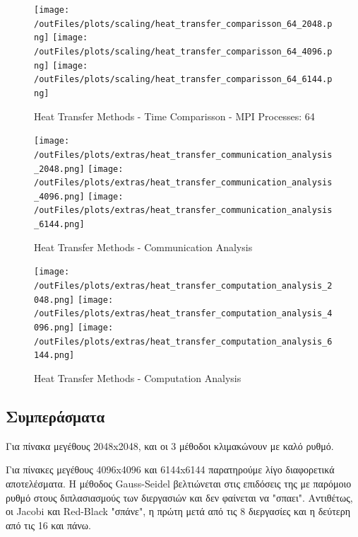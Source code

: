 \documentclass[../final_report.tex]{subfiles}
\begin{document}
\begin{figure}[H]
    \centering
    \texttt{[image: /outFiles/plots/scaling/heat\_transfer\_comparisson\_64\_2048.png]}
    \texttt{[image: /outFiles/plots/scaling/heat\_transfer\_comparisson\_64\_4096.png]}
    \texttt{[image: /outFiles/plots/scaling/heat\_transfer\_comparisson\_64\_6144.png]}
    \caption{Heat Transfer Methods - Time Comparisson - MPI Processes: 64}
    \label{fig:Heat Transfer Methods - Time Comparisson - MPI Processes: 64}
\end{figure}

\begin{figure}[H]
    \centering
    \texttt{[image: /outFiles/plots/extras/heat\_transfer\_communication\_analysis\_2048.png]}
    \texttt{[image: /outFiles/plots/extras/heat\_transfer\_communication\_analysis\_4096.png]}
    \texttt{[image: /outFiles/plots/extras/heat\_transfer\_communication\_analysis\_6144.png]}
    \caption{Heat Transfer Methods - Communication Analysis}
    \label{fig:Heat Transfer Methods - Communication Analysis}
\end{figure}

\begin{figure}[H]
    \centering
    \texttt{[image: /outFiles/plots/extras/heat\_transfer\_computation\_analysis\_2048.png]}
    \texttt{[image: /outFiles/plots/extras/heat\_transfer\_computation\_analysis\_4096.png]}
    \texttt{[image: /outFiles/plots/extras/heat\_transfer\_computation\_analysis\_6144.png]}
    \caption{Heat Transfer Methods - Computation Analysis}
    \label{fig:Heat Transfer Methods - Computation Analysis}
\end{figure}

\subsection*{Συμπεράσματα}


Για πίνακα μεγέθους 2048x2048, και οι 3 μέθοδοι κλιμακώνουν με καλό ρυθμό.

Για πίνακες μεγέθους 4096x4096 και 6144x6144 παρατηρούμε λίγο διαφορετικά αποτελέσματα. Η μέθοδος Gauss-Seidel βελτιώνεται στις επιδόσεις της
με παρόμοιο ρυθμό στους διπλασιασμούς των διεργασιών και δεν φαίνεται να "σπαει". Αντιθέτως, οι Jacobi και Red-Black "σπάνε", η πρώτη μετά από τις 8 διεργασίες
και η δεύτερη από τις 16 και πάνω.
\end{document}
